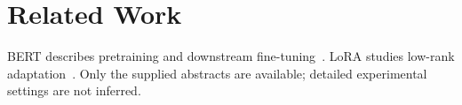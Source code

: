 \section{Related Work}
BERT describes pretraining and downstream fine-tuning~\cite{devlin2019bert}.
LoRA studies low-rank adaptation~\cite{hu2022lora}.
Only the supplied abstracts are available; detailed experimental settings are not inferred.

